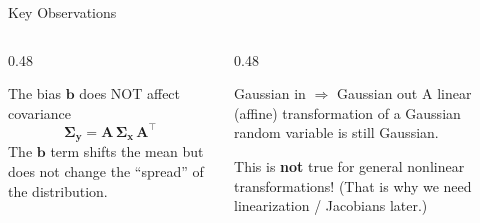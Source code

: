 \documentclass[aspectratio=169, 11pt]{beamer}
\newcommand{\T}{^{\top}}
\begin{document}
\begin{frame}{Key Observations}

\begin{columns}[T]
\begin{column}{0.48\textwidth}
\begin{alertblock}{The bias $\mathbf{b}$ does NOT affect covariance}
$$\bm{\Sigma}_{\mathbf{y}} = \mathbf{A}\,\bm{\Sigma}_{\mathbf{x}}\,\mathbf{A}\T$$
The $\mathbf{b}$ term shifts the mean but does not change the ``spread'' of the distribution.
\end{alertblock}
\end{column}
\begin{column}{0.48\textwidth}
\begin{exampleblock}{Gaussian in $\Rightarrow$ Gaussian out}
A linear (affine) transformation of a Gaussian random variable is still Gaussian.

\vspace{4pt}
This is \textbf{not} true for general nonlinear transformations!
(That is why we need linearization / Jacobians later.)
\end{exampleblock}
\end{column}
\end{columns}

\vspace{10pt}

\begin{center}
\end{center}

\end{frame}
\end{document}
